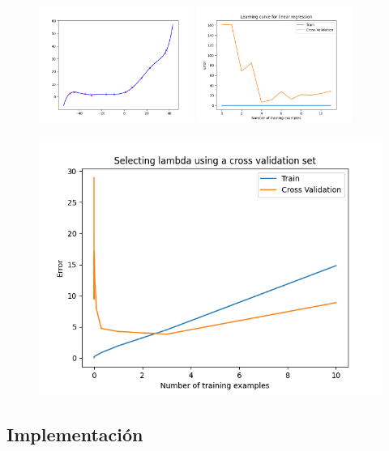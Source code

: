\documentclass[11pt]{article}
\begin{document}
 \begin{figure}[h!]
    \begin{center}
    \includegraphics[width=0.45\textwidth]{Figura3.png}
    \includegraphics[width=0.45\textwidth]{Figura4.png}
    \end{center}
 \end{figure}

 \begin{figure}[h!]
    \begin{center}
    \includegraphics[width=\textwidth]{Figura5.png}
    \end{center}
 \end{figure}
\newpage
\subsection{Implementación}


\end{document}

